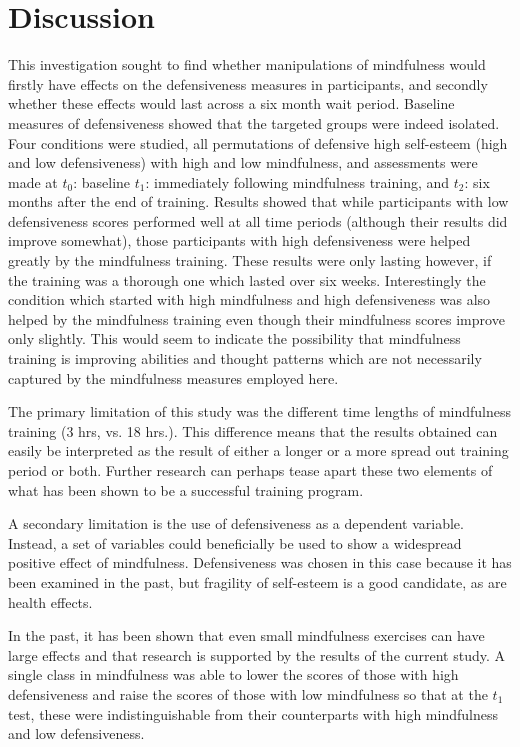 \documentclass[jou]{apa}
\begin{document}
\section{Discussion}
This investigation sought to find whether manipulations of mindfulness would firstly have effects on the defensiveness measures in participants, and secondly whether these effects would last across a six month wait period.  Baseline measures of defensiveness showed that the targeted groups were indeed isolated.  Four conditions were studied, all permutations of defensive high self-esteem (high and low defensiveness) with high and low mindfulness, and assessments were made at $t_0$: baseline $t_1$: immediately following mindfulness training, and $t_2$: six months after the end of training.  Results showed that while participants with low defensiveness scores performed well at all time periods (although their results did improve somewhat), those participants with high defensiveness were helped greatly by the mindfulness training.  These results were only lasting however, if the training was a thorough one which lasted over six weeks.  Interestingly the condition which started with high mindfulness and high defensiveness was also helped by the mindfulness training even though their mindfulness scores improve only slightly.  This would seem to indicate the possibility that mindfulness training is improving abilities and thought patterns which are not necessarily captured by the mindfulness measures employed here.  

The primary limitation of this study was the different time lengths of mindfulness training (3 hrs, vs. 18 hrs.).  This difference means that the results obtained can easily be interpreted as the result of either a longer or a more spread out training period or both.  Further research can perhaps tease apart these two elements of what has been shown to be a successful training program.  

A secondary limitation is the use of defensiveness as a dependent variable.  Instead, a set of variables could beneficially be used to show a widespread positive effect of mindfulness.  Defensiveness was chosen in this case because it has been examined in the past, but fragility of self-esteem is a good candidate, as are health effects.  

In the past, it has been shown that even small mindfulness exercises can have large effects and that research is supported by the results of the current study.  A single class in mindfulness was able to lower the scores of those with high defensiveness and raise the scores of those with low mindfulness so that at the $t_1$ test, these were indistinguishable from their counterparts with high mindfulness and low defensiveness.  
\end{document}
